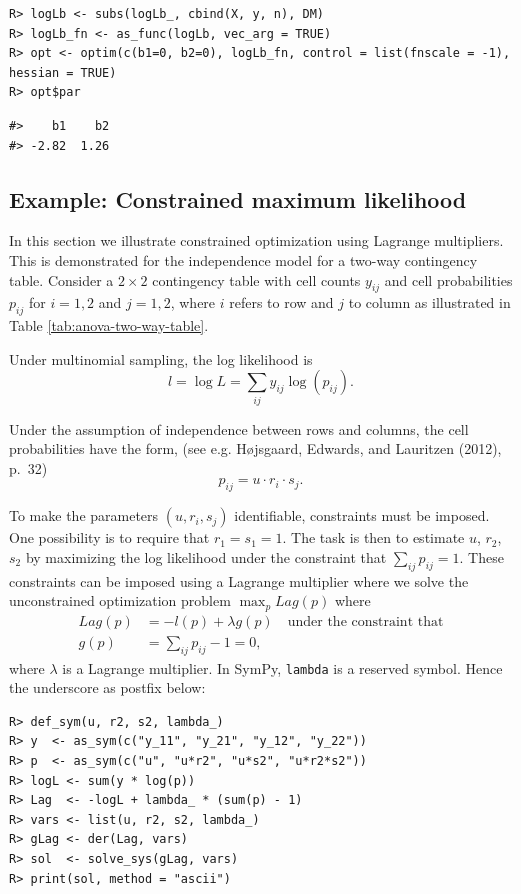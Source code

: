 \begin{verbatim}
R> logLb <- subs(logLb_, cbind(X, y, n), DM)
R> logLb_fn <- as_func(logLb, vec_arg = TRUE)
R> opt <- optim(c(b1=0, b2=0), logLb_fn, control = list(fnscale = -1), hessian = TRUE)
R> opt$par
\end{verbatim}

\begin{verbatim}
#>    b1    b2 
#> -2.82  1.26
\end{verbatim}

\hypertarget{example-constrained-maximum-likelihood}{%
\subsection{Example: Constrained maximum likelihood}\label{example-constrained-maximum-likelihood}}

In this section we illustrate constrained optimization using Lagrange multipliers.
This is demonstrated for the independence model for a two-way contingency table.
Consider a \(2 \times 2\) contingency table with cell
counts \(y_{ij}\) and cell probabilities \(p_{ij}\) for \(i=1,2\) and \(j=1,2\),
where \(i\) refers to row and \(j\) to column as
illustrated in Table \ref{tab:anova-two-way-table}.

Under multinomial sampling, the log likelihood is
\[
 l = \log L = \sum_{ij} y_{ij} \log(p_{ij}).
\]

Under the assumption of independence between rows and columns, the cell
probabilities have the form, (see e.g. Højsgaard, Edwards, and Lauritzen (2012), p.~32)
\[
p_{ij}=u \cdot r_i \cdot s_j.
\]

To make the parameters \((u, r_i, s_j)\) identifiable, constraints
must be imposed. One possibility is to require that \(r_1=s_1=1\). The
task is then to estimate \(u\), \(r_2\), \(s_2\) by maximizing the log likelihood
under the constraint that \(\sum_{ij} p_{ij} = 1\). These constraints
can be
imposed using a Lagrange multiplier where we solve the
unconstrained optimization problem \(\max_p Lag(p)\) where
\begin{align}
  Lag(p) &= -l(p) + \lambda g(p) \quad \text{under the constraint that} \\
  g(p) &= \sum_{ij} p_{ij} - 1 = 0 ,
\end{align}
where \(\lambda\) is a Lagrange multiplier.
In SymPy, \texttt{lambda} is a reserved symbol. Hence the underscore as postfix below:

\begin{verbatim}
R> def_sym(u, r2, s2, lambda_)
R> y  <- as_sym(c("y_11", "y_21", "y_12", "y_22"))
R> p  <- as_sym(c("u", "u*r2", "u*s2", "u*r2*s2"))
R> logL <- sum(y * log(p))
R> Lag  <- -logL + lambda_ * (sum(p) - 1) 
R> vars <- list(u, r2, s2, lambda_)
R> gLag <- der(Lag, vars)
R> sol  <- solve_sys(gLag, vars)
R> print(sol, method = "ascii")
\end{verbatim}

